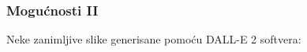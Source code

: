 \documentclass{beamer}
\begin{document}
\begin{frame}[fragile]\frametitle{Mogućnosti II}
	Neke zanimljive slike generisane pomoću DALL-E 2 softvera:
	\begin{figure}%
    \centering
    \qquad

\end{figure}
\end{frame}
\end{document}
